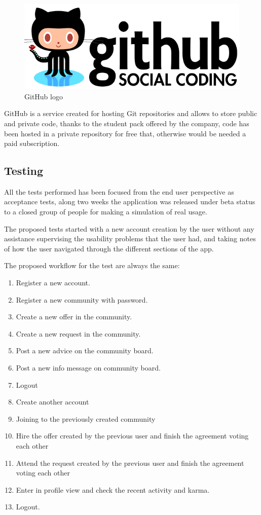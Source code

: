 \documentclass{DeustoFDP}
\begin{document}
\begin{figure}[h]
\centering
\includegraphics[width=0.7\linewidth]{fig/github-logo}
\caption[GitHub logo]{GitHub logo}
\label{fig:github-logo}
\end{figure}

GitHub \cite{Github} is a service created for hosting Git repositories and allows to store public and private code, thanks to the student pack offered by the company, code has been hosted in a private repository for free that, otherwise would be needed a paid subscription.
\newpage
\subsection{Testing}
All the tests performed has been focused from the end user perspective as acceptance tests, along two weeks the application was released under beta status to a closed group of people for making a simulation of real usage.

The proposed tests started with a new account creation by the user without any assistance supervising the usability problems that the user had, and taking notes of how the user navigated through the different sections of the app.

The proposed workflow for the test are always the same:

\begin{enumerate}
	\item Register a new account.
	\item Register a new community with password.
	\item Create a new offer in the community.
	\item Create a new request in the community.
	\item Post a new advice on the community board.
	\item Post a new info message on community board.
	\item Logout
	\item Create another account
	\item Joining to the previously created community
	\item Hire the offer created by the previous user and finish the agreement voting each other
	\item Attend the request created by the previous user and finish the agreement voting each other
	\item Enter in profile view and check the recent activity and karma.
	\item Logout.
\end{enumerate}
\end{document}
